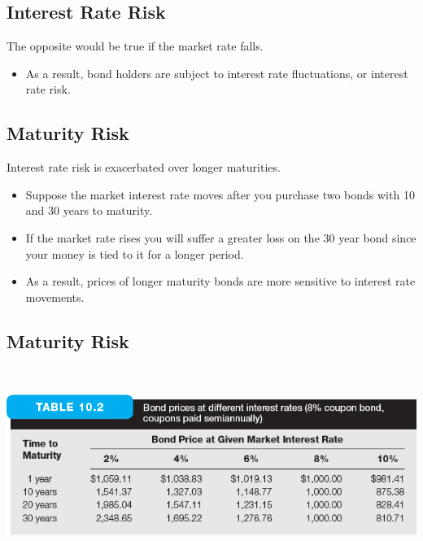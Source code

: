 \documentclass[letterpaper,10pt,english]{sphinxmanual}
\begin{document}
\subsection{Interest Rate Risk}
\label{bondPrices:id15}
The opposite would be true if the market rate falls.
\begin{itemize}
\item {} 
As a result, bond holders are subject to interest rate fluctuations,
or interest rate risk.

\end{itemize}


\subsection{Maturity Risk}
\label{bondPrices:maturity-risk}
Interest rate risk is exacerbated over longer maturities.
\begin{itemize}
\item {} 
Suppose the market interest rate moves after you purchase two bonds
with 10 and 30 years to maturity.

\end{itemize}
\begin{itemize}
\item {} 
If the market rate rises you will suffer a greater loss on the 30
year bond since your money is tied to it for a longer period.

\end{itemize}
\begin{itemize}
\item {} 
As a result, prices of longer maturity bonds are more sensitive to
interest rate movements.

\end{itemize}


\subsection{Maturity Risk}
\label{bondPrices:id16}
$\qquad$

\includegraphics[width=6in]{table10_2_lg.jpg}
\end{document}
